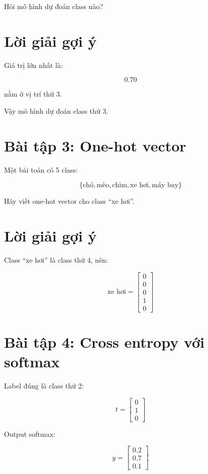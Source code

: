 \documentclass[12pt,a4paper]{report}
\begin{document}
Hỏi mô hình dự đoán class nào?

\section*{Lời giải gợi ý}

Giá trị lớn nhất là:

\[
    0.70
\]

nằm ở vị trí thứ 3.

Vậy mô hình dự đoán class thứ 3.

\section*{Bài tập 3: One-hot vector}

Một bài toán có 5 class:

\[
    \{\text{chó}, \text{mèo}, \text{chim}, \text{xe hơi}, \text{máy bay}\}
\]

Hãy viết one-hot vector cho class ``xe hơi''.

\section*{Lời giải gợi ý}

Class ``xe hơi'' là class thứ 4, nên:

\[
    \text{xe hơi}
    =
    \begin{bmatrix}
    0\\
    0\\
    0\\
    1\\
    0
    \end{bmatrix}
\]

\section*{Bài tập 4: Cross entropy với softmax}

Label đúng là class thứ 2:

\[
    t =
    \begin{bmatrix}
    0\\
    1\\
    0
    \end{bmatrix}
\]

Output softmax:

\[
    y =
    \begin{bmatrix}
    0.2\\
    0.7\\
    0.1
    \end{bmatrix}
\]
\end{document}
